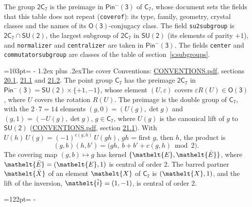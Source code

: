 \documentclass[10pt,a4paper]{article}
\makeatletter
\renewcommand\section{\@startsection{section}{1}{\z@}{-3ex plus -1ex minus -.2ex}%
  {1.2ex plus .2ex}{\normalfont\large\sffamily\bfseries\color{parttitle}}}
\newcommand{\needspace}[1]{\par\penalty-100\begingroup\dimen0=#1\relax\dimen2=\pagegoal
  \advance\dimen2-\pagetotal\ifdim\dimen0>\dimen2\relax\ifdim\dimen2>0pt\vfil\break\fi\fi
  \endgroup}
\numberwithin{equation}{section}
\newcommand{\eltfont}[1]{{\let\sigma\eltsigma\mathelt{#1}}}
\newcommand{\grp}[1]{\mathsf{#1}}
\newcommand{\elt}[1]{\eltfont{#1}}
\newcommand{\dirprod}{\times}
\newcommand{\barred}[1]{\bar{#1}}
\newcommand{\lift}[1]{\tilde{#1}}
\makeatother
\begin{document}
\leavevmode\label{n:element.inversion}\label{n:group.preimage}The group $\grp{2C_{7}}$ is the preimage in $\grp{Pin^{-}(3)}$ of \href{../../../rotation/data/pdf/C7.pdf}{$\grp{C_{7}}$}, whose document sets the fields that this table does not repeat (\texttt{coverof}): its type, family, geometry, crystal classes and the names of its \href{../../../rotation/data/pdf/O3.pdf}{$\grp{O(3)}$}-conjugacy class. The field \texttt{su2subgroup} is $\grp{2C_{7}} \cap \grp{SU(2)}$, the largest subgroup of $\grp{2C_{7}}$ in $\grp{SU(2)}$ (its elements of parity $+1$), and \texttt{normalizer} and \texttt{centralizer} are taken in $\grp{Pin^{-}(3)}$. The fields \texttt{center} and \texttt{commutatorsubgroup} are classes of the table of section~\ref{s:subgroups}.
\needspace{103pt}
\section{The cover}\label{s:cover}
Conventions: \href{../../CONVENTIONS.pdf}{CONVENTIONS.pdf}, sections \href{../../CONVENTIONS.pdf\#conv.20.1}{20.1}, \href{../../CONVENTIONS.pdf\#conv.21.1}{21.1} and \href{../../CONVENTIONS.pdf\#conv.21.2}{21.2}.
\leavevmode\label{n:group.pin.minus}\label{n:group.su2}\label{n:local.pin.sign}\label{n:matrix.covered}\label{n:matrix.lift.su2}\label{n:index.bar}The point group $\grp{C_{7}}$ has the preimage $\grp{2C_{7}}$ in $\grp{Pin^{-}(3)} = \grp{SU(2)} \dirprod \{+1, -1\}$, whose element $(U, \varepsilon)$ covers $\varepsilon R(U) \in \grp{O(3)}$, where $U$ covers the rotation $R(U)$. The preimage is the double group of $\grp{C_{7}}$, with the $2 \cdot 7 = 14$ elements $(g, 0) = (U(g), \det g)$ and $(g, 1) = (-U(g), \det g)$, $g \in \grp{C_{7}}$, where $U(g)$ is the canonical lift of $g$ to $\grp{SU(2)}$ (\href{../../CONVENTIONS.pdf}{CONVENTIONS.pdf}, section \href{../../CONVENTIONS.pdf\#conv.21.1}{21.1}). \label{n:function.cocycle}With $U(h)\,U(g) = (-1)^{c(g,h)}\,U(gh)$, $gh$ = first $g$, then $h$, the product is
\begin{equation}\label{e:product}(g, b)(h, b') = \bigl(gh,\ b + b' + c(g, h) \bmod 2\bigr).\end{equation}
\leavevmode\label{n:mark.bar}The covering map $(g, b) \mapsto g$ has kernel $\{\elt{E}, \elt{\barred{E}}\}$, where $\elt{\barred{E}} = (\elt{E}, 1)$ is central of order 2. \label{n:element.named}\label{n:mark.lift}The barred partner $\elt{\barred{X}}$ of an element $\elt{X}$ of $\grp{C_{7}}$ is $(\elt{X}, 1)$, and the lift of the inversion, $\elt{\lift{i}} = (1, -1)$, is central of order 2.
\needspace{122pt}
\end{document}
